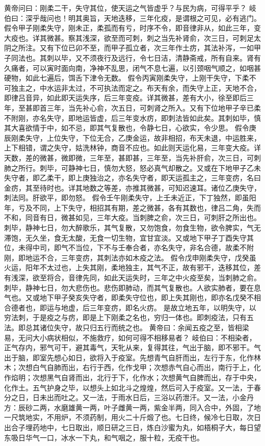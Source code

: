 \documentclass[a4paper,12pt,UTF8,twoside]{ctexbook}
\begin{document}
黄帝问曰：刚柔二干，失守其位，使天运之气皆虚乎？与民为病，可得平乎？
岐伯曰：深乎哉问也！明其奥旨，天地迭移，三年化疫，是谓根之可见，必有逃门。
假令甲子刚柔失守，刚未正，柔孤而有亏，时序不令，即音律非从，如此三年，变大疫也。详其微甚。察其浅深，欲至而可刺，刺之当先补肾俞，次三日，可刺足太阴之所注。又有下位已卯不至，而甲子孤立者，次三年作土疠，其法补泻，一如甲子同法也。其刺以毕，又不须夜行及远行，令七日洁，清静斋戒，所有自来。肾有久痛者，可以寅时面向南，净神不乱思，闭气不息七遍，以引颈咽气顺之，如咽甚硬物，如此七遍后，饵舌下津令无数。
假令丙寅刚柔失守，上刚干失守，下柔不可独主之，中水运非太过，不可执法而定之。布天有余，而失守上正，天地不合，即律吕音异，如此即天运失序，后三年变疫。详其微甚，差有大小，徐至即后三年，至甚即首三年，当先补心俞，次五日，可刺肾之所入。又有下位地甲子辛已柔不附刚，亦名失守，即地运皆虚，后三年变水疠，即刺法皆如此矣。其刺如毕，慎其大喜欲情于中，如不忌，即其气复散也，令静七日，心欲实，令少思。
假令庚辰刚柔失守，上位失守，下位无合，乙庚金运，故非相招，布天未退，中运胜来，上下相错，谓之失守，姑洗林钟，商音不应也。如此则天运化易，三年变大疫。详天数，差的微甚，微即微，三年至，甚即甚，三年至，当先补肝俞，次三日，可刺肺之所行。刺毕，可静神七日，慎勿大怒，怒必真气却散之。又或在下地甲子乙未失守者，即乙柔干，即上庚独治之，亦名失守者，即天运孤主之，三年变疠，名曰金疠，其至待时也。详其地数之等差，亦推其微甚，可知迟速耳。诸位乙庚失守，刺法同。肝欲平，即勿怒。
假令壬午刚柔失守，上壬未近正，下丁独然，即虽阳年，亏及不同，上下失守，相招其有期，差之微甚，各有其数也，律吕二角，失而不和，同音有日，微甚如见，三年大疫。当刺脾之俞，次三日，可刺肝之所出也。刺毕，静神七日，勿大醉歌乐，其气复散，又勿饱食，勿食生物，欲令脾实，气无滞饱，无久坐，食无太酸，无食一切生物，宜甘宜淡。又或地下甲子丁酉失守其位，未得中司，即气不当位，下不与壬奉合者，亦名失守，非名合德，故柔不附刚，即地运不合，三年变疠，其刺法亦如木疫之法。
假令戊申刚柔失守，戊癸虽火运，阳年不太过也，上失其刚，柔地独主，其气不正，故有邪干，迭移其位，差有浅深，欲至将合，音律先同，如此天运失时，三年之中火疫至矣，当刺肺之俞。刺毕，静神七日，勿大悲伤也。悲伤即肺动，而其气复散也。人欲实肺者，要在息气也。又或地下甲子癸亥失守者，即柔失守位也，即上失其刚也，即亦名戊癸不相合德者也，即运与地虚，后三年变疠，即名火疠。
是故立地五年，以明失守，以穷法刺，于是疫之与疠，即是上下刚柔之名也，穷归一体也。即刺疫法，只有五法。即总其诸位失守，故只归五行而统之也。
黄帝曰：余闻五疫之至，皆相梁易，无问大小病状相似，不施救疗，如何可得不相移易者？
岐伯曰：不相染者，正气存内，邪气可干，避其毒气，天牝从来，复得其往，气出于脑，即不邪干。气出于脑，即室先想心如日，欲将入于疫室。先想青气自肝而出，左行于东，化作林木；次想白气自肺而出，右行于西，化作戈甲；次想赤气自心而出，南行于上，化作焰明；次想黑气自肾而出，北行于下，化作水；次想黄气自脾而出，存于中央，化作土。五气护身之毕，以想头上如北斗之煌煌，然后可入于疫室。又一法，于春分之日，日未出而吐之。又一法，于雨水日后，三浴以药泄汗。又一法，小金丹方：辰砂二两，水磨雄黄一两，叶子雌黄一两，紫金半两，同入合中，外固，了地一尺筑地实，不用炉，不须药制，用火二十斤煅了也。七日终，候冷七日取，次日出合子埋药地中，七日取出，顺日研之三日，炼白沙蜜为丸，如梧桐子大，每日望东吸日华气一口，冰水一下丸，和气咽之，服十粒，无疫干也。
\end{document}

